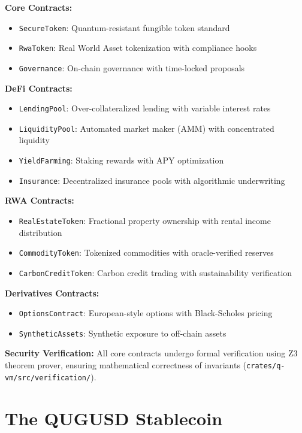 \documentclass[11pt,a4paper]{scrartcl}
\begin{document}
\textbf{Core Contracts:}
\begin{itemize}
\item \texttt{SecureToken}: Quantum-resistant fungible token standard
\item \texttt{RwaToken}: Real World Asset tokenization with compliance hooks
\item \texttt{Governance}: On-chain governance with time-locked proposals
\end{itemize}

\textbf{DeFi Contracts:}
\begin{itemize}
\item \texttt{LendingPool}: Over-collateralized lending with variable interest rates
\item \texttt{LiquidityPool}: Automated market maker (AMM) with concentrated liquidity
\item \texttt{YieldFarming}: Staking rewards with APY optimization
\item \texttt{Insurance}: Decentralized insurance pools with algorithmic underwriting
\end{itemize}

\textbf{RWA Contracts:}
\begin{itemize}
\item \texttt{RealEstateToken}: Fractional property ownership with rental income distribution
\item \texttt{CommodityToken}: Tokenized commodities with oracle-verified reserves
\item \texttt{CarbonCreditToken}: Carbon credit trading with sustainability verification
\end{itemize}

\textbf{Derivatives Contracts:}
\begin{itemize}
\item \texttt{OptionsContract}: European-style options with Black-Scholes pricing
\item \texttt{SyntheticAssets}: Synthetic exposure to off-chain assets
\end{itemize}

\textbf{Security Verification:} All core contracts undergo formal verification using Z3 theorem prover, ensuring mathematical correctness of invariants (\texttt{crates/q-vm/src/verification/}).

\newpage

\section{The QUGUSD Stablecoin}
\end{document}
